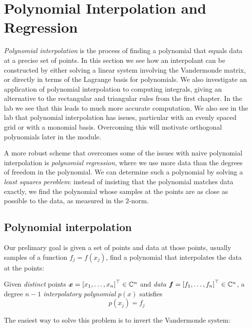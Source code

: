 
\section{Polynomial Interpolation and Regression}
\emph{Polynomial interpolation} is the process of finding a polynomial that equals data at a precise set of points. In this section we see how an interpolant can be constructed by either solving a linear system involving the Vandermonde matrix, or directly in terms of the Lagrange basis for polynomials. We also investigate an application of polynomial interpolation to computing integrals, giving an alternative to the rectangular and triangular rules from the first chapter. In the lab we see that this leads to much more accurate computation. We also see in the lab that polynomial interpolation has issues, particular with an evenly spaced grid or with a monomial basis. Overcoming this will motivate orthogonal polynomials later in the module.

A more robust scheme that overcomes some of the issues with naive polynomial interpolation is \emph{polynomial regression}, where we use more data than the degrees of freedom in the polynomial. We can determine such a polynomial by solving a \emph{least squares peroblem}: instead of insisting that the polynomial matches data exactly, we find the polynomial whose samples at the points are as close as possible to the data, as measured in the $2$-norm. 

\subsection{Polynomial interpolation}
Our prelimary goal is given a set of points and data at those points, usually samples of a function $f_j = f(x_j)$, find a polynomial that interpolates the data at the points:

\begin{definition} Given \emph{distinct} points $\ensuremath{\bm{\x}} = \vectt[x_1,\ensuremath{\ldots},x_n] \ensuremath{\in} \ensuremath{\bbC} ^n$ and \emph{data} $\ensuremath{\bm{\f}} = \vectt[f_1,\ensuremath{\ldots},f_n] \ensuremath{\in} \ensuremath{\bbC}^n$, a degree $n-1$ \emph{interpolatory polynomial} $p(x)$ satisfies
\[
p(x_j) = f_j
\]
\end{definition}

The easiest way to solve this problem is to invert the Vandermonde system:

